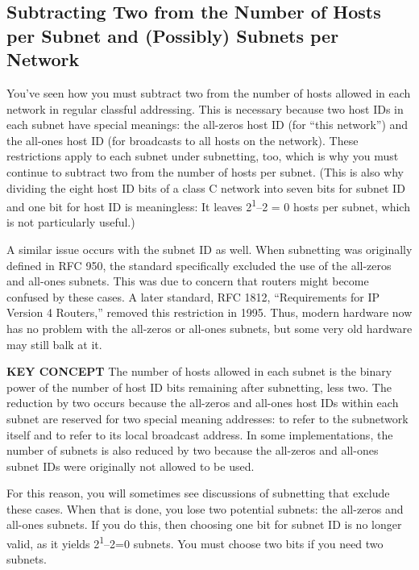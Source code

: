 \subsection[Subtracting Two from the Number of Hosts per Subnet and
(Possibly) Subnets per
Network]{\texorpdfstring{\protect\hypertarget{ch18s05.htmlux5cux23subtracting_two_from_the_number_of_hosts}{}{}Subtracting
Two from the Number of Hosts per Subnet and (Possibly) Subnets per
Network}{Subtracting Two from the Number of Hosts per Subnet and (Possibly) Subnets per Network}}

You've seen how you must subtract two from the number of hosts allowed
in each network in regular classful addressing. This is necessary
because two host IDs in each subnet have special meanings: the all-zeros
host ID (for ``this network'') and the all-ones host ID (for broadcasts to
all hosts on the network). These restrictions apply to each subnet under
subnetting, too, which is why you must continue to subtract two from the
number of hosts per subnet. (This is also why dividing the eight host ID
bits of a class C network into seven bits for subnet ID and one bit for
host ID is meaningless: It leaves
2\protect\hypertarget{ch18s05.htmlux5cux23idx-CHP-18-0738}{}{}\textsuperscript{1}--2
= 0 hosts per subnet, which is not particularly useful.)

A similar issue occurs with the subnet ID as well. When subnetting was
originally defined in RFC 950, the standard specifically excluded the
use of the all-zeros and all-ones subnets. This was due to concern that
routers might become confused by these cases. A later standard, RFC
1812, ``Requirements for IP Version 4 Routers,'' removed this restriction
in 1995. Thus, modern hardware now has no problem with the all-zeros or
all-ones subnets, but some very old hardware may still balk at it.


{\textbf{KEY CONCEPT}} The number of hosts allowed in each subnet is the
binary power of the number of host ID bits remaining after subnetting,
less two. The reduction by two occurs because the all-zeros and all-ones
host IDs within each subnet are reserved for two special meaning
addresses: to refer to the subnetwork itself and to refer to its local
broadcast address. In some implementations, the number of subnets is
also reduced by two because the all-zeros and all-ones subnet IDs were
originally not allowed to be used.

For this reason, you will sometimes see discussions of subnetting that
exclude these cases. When that is done, you lose two potential subnets:
the all-zeros and all-ones subnets. If you do this, then choosing one
bit for subnet ID is no longer valid, as it yields
2\textsuperscript{1}--2=0 subnets. You must choose two bits if you need
two subnets.

